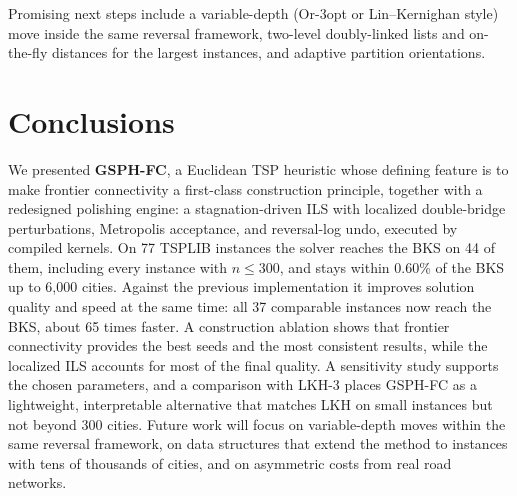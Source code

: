 \documentclass[runningheads]{llncs}
\begin{document}
Promising next steps include a variable-depth (Or-3opt or
Lin--Kernighan style) move inside the same reversal framework,
two-level doubly-linked lists and on-the-fly distances for the largest
instances, and adaptive partition orientations.

\section{Conclusions}
\label{sec:conclusions}

We presented \textbf{GSPH-FC}, a Euclidean TSP heuristic whose defining
feature is to make frontier connectivity a first-class construction
principle, together with a redesigned polishing engine: a
stagnation-driven ILS with localized double-bridge perturbations,
Metropolis acceptance, and reversal-log undo, executed by compiled
kernels. On 77 TSPLIB instances the solver reaches the BKS on
44 of them, including every instance with $n\le 300$, and
stays within 0.60\% of the BKS up to 6{,}000 cities.
Against the previous implementation it improves solution quality and
speed at the same time: all 37 comparable instances now
reach the BKS, about 65 times faster. A construction ablation shows that
frontier connectivity provides the best seeds and the most consistent
results, while the localized ILS accounts for most of the final quality.
A sensitivity study supports the chosen parameters, and a comparison
with LKH-3 places GSPH-FC as a lightweight, interpretable alternative
that matches LKH on small instances but not beyond 300 cities. Future
work will focus on variable-depth moves within the same reversal
framework, on data structures that extend the method to instances with
tens of thousands of cities, and on asymmetric costs from real road
networks.

%



\end{document}
